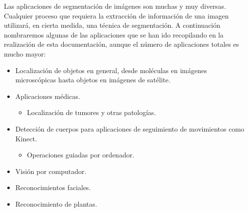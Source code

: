 Las aplicaciones de segmentaci\'{o}n de im\'{a}genes son muchas y muy diversas. Cualquier proceso que requiera la extracci\'{o}n de informaci\'{o}n de una imagen utilizar\'{a}, en cierta medida, una t\'{e}cnica de segmentaci\'{o}n. A continuaci\'{o}n nombraremos algunas de las aplicaciones que se han ido recopilando en la realizaci\'{o}n de esta documentaci\'{o}n, aunque el n\'{u}mero de aplicaciones totales es mucho mayor:

\begin{itemize}
	\item Localizaci\'{o}n de objetos en general, desde mol\'{e}culas en im\'{a}genes microsc\'{o}picas hasta objetos en im\'{a}genes de sat\'{e}lite.
	\item Aplicaciones m\'{e}dicas.
			\begin{itemize}
				\item Localizaci\'{o}n de tumores y otras patolog\'{i}as.
			\end{itemize}
	\item Detecci\'{o}n de cuerpos para aplicaciones de seguimiento de movimientos como Kinect.
		\begin{itemize}
			\item Operaciones guiadas por ordenador.
		\end{itemize}
	\item Visi\'{o}n por computador.
	\item Reconocimientos faciales.
	\item Reconocimiento de plantas.
\end{itemize}